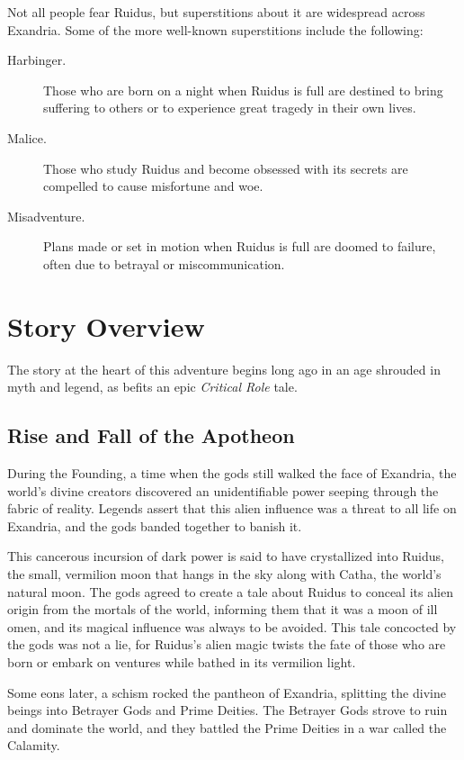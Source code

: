 \documentclass[10pt,a4paper,twoside,fancy,bg=print,twocolumn,openany,nodeprecatedcode]{dndbook}
\begin{document}
Not all people fear Ruidus, but superstitions about it are widespread across Exandria. Some of the more well-known superstitions include the following:


\begin{description}
\item[Harbinger.]
Those who are born on a night when Ruidus is full are destined to bring suffering to others or to experience great tragedy in their own lives.
\item[Malice.]
Those who study Ruidus and become obsessed with its secrets are compelled to cause misfortune and woe.
\item[Misadventure.]
Plans made or set in motion when Ruidus is full are doomed to failure, often due to betrayal or miscommunication.
\end{description}

\section{Story Overview}
The story at the heart of this adventure begins long ago in an age shrouded in myth and legend, as befits an epic \textit{Critical Role} tale.

\subsection{Rise and Fall of the Apotheon}
During the Founding, a time when the gods still walked the face of Exandria, the world's divine creators discovered an unidentifiable power seeping through the fabric of reality. Legends assert that this alien influence was a threat to all life on Exandria, and the gods banded together to banish it.

This cancerous incursion of dark power is said to have crystallized into Ruidus, the small, vermilion moon that hangs in the sky along with Catha, the world's natural moon. The gods agreed to create a tale about Ruidus to conceal its alien origin from the mortals of the world, informing them that it was a moon of ill omen, and its magical influence was always to be avoided. This tale concocted by the gods was not a lie, for Ruidus's alien magic twists the fate of those who are born or embark on ventures while bathed in its vermilion light.

Some eons later, a schism rocked the pantheon of Exandria, splitting the divine beings into Betrayer Gods and Prime Deities. The Betrayer Gods strove to ruin and dominate the world, and they battled the Prime Deities in a war called the Calamity.
\end{document}
